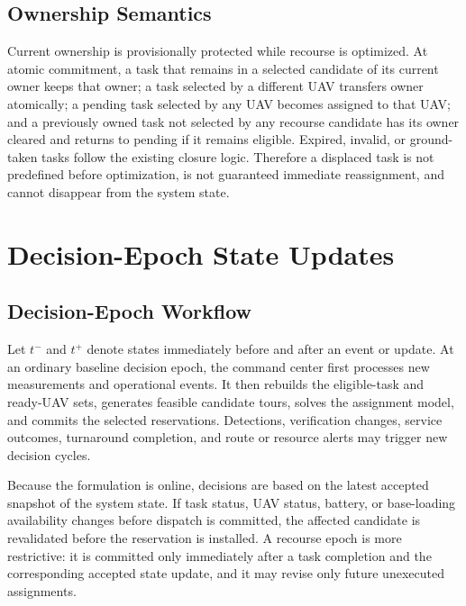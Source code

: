 \documentclass[conference]{IEEEtran}
\begin{document}
\subsection{Ownership Semantics}
Current ownership is provisionally protected while recourse is optimized. At atomic commitment, a task that remains in a selected candidate of its current owner keeps that owner; a task selected by a different UAV transfers owner atomically; a pending task selected by any UAV becomes assigned to that UAV; and a previously owned task not selected by any recourse candidate has its owner cleared and returns to pending if it remains eligible. Expired, invalid, or ground-taken tasks follow the existing closure logic. Therefore a displaced task is not predefined before optimization, is not guaranteed immediate reassignment, and cannot disappear from the system state.

\section{Decision-Epoch State Updates}
\subsection{Decision-Epoch Workflow}
Let $t^-$ and $t^+$ denote states immediately before and after an event or update. At an ordinary baseline decision epoch, the command center first processes new measurements and operational events. It then rebuilds the eligible-task and ready-UAV sets, generates feasible candidate tours, solves the assignment model, and commits the selected reservations. Detections, verification changes, service outcomes, turnaround completion, and route or resource alerts may trigger new decision cycles.

Because the formulation is online, decisions are based on the latest accepted snapshot of the system state. If task status, UAV status, battery, or base-loading availability changes before dispatch is committed, the affected candidate is revalidated before the reservation is installed. A recourse epoch is more restrictive: it is committed only immediately after a task completion and the corresponding accepted state update, and it may revise only future unexecuted assignments.
\end{document}
